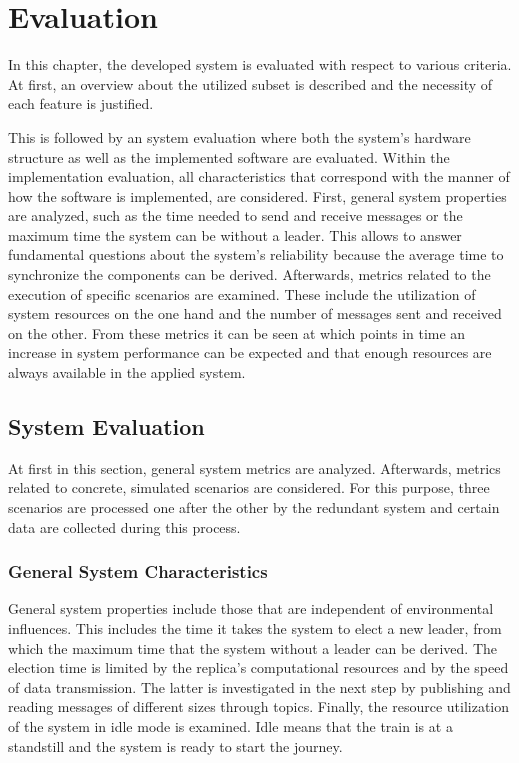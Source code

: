 \chapter{Evaluation}
\label{cpt:evaluation}
In this chapter, the developed system is evaluated with respect to various criteria.
At first, an overview about the utilized  subset is described and the necessity of each feature is justified.

This is followed by an system evaluation where both the system's hardware structure as well as the implemented software are evaluated.
Within the implementation evaluation, all characteristics that correspond with the manner of how the software is implemented, are considered.
First, general system properties are analyzed, such as the time needed to send and receive messages or the maximum time the system can be without a leader.
This allows to answer fundamental questions about the system's reliability because the average time to synchronize the components can be derived.
Afterwards, metrics related to the execution of specific scenarios are examined.
These include the utilization of system resources on the one hand and the number of messages sent and received on the other.
From these metrics it can be seen at which points in time an increase in system performance can be expected and that enough resources are always available in the applied system.

\section{System Evaluation}
At first in this section, general system metrics are analyzed.
Afterwards, metrics related to concrete, simulated scenarios are considered.
For this purpose, three scenarios are processed one after the other by the redundant system and certain data are collected during this process.

\subsection{General System Characteristics}
General system properties include those that are independent of environmental influences.
This includes the time it takes the system to elect a new leader, from which the maximum time that the system without a leader can be derived.
The election time is limited by the replica's computational resources and by the speed of data transmission.
The latter is investigated in the next step by publishing and reading messages of different sizes through  topics.
Finally, the resource utilization of the system in idle mode is examined.
Idle means that the train is at a standstill and the system is ready to start the journey.

